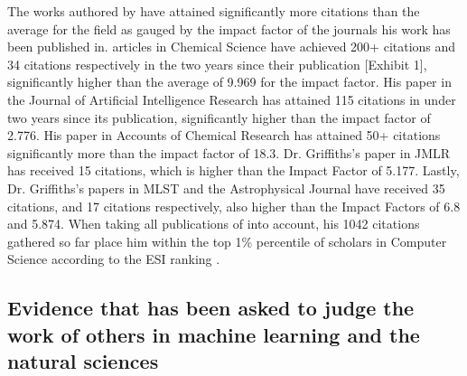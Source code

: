 \documentclass[11pt]{article}
\begin{document}
The works authored by \dr have attained significantly more citations than the average for the field as gauged by the impact factor of the journals his work has been published in. \drs articles in Chemical Science have achieved 200+ citations and 34 citations respectively in the two years since their publication [Exhibit 1], significantly higher than the average of 9.969 for the impact factor. His paper in the Journal of Artificial Intelligence Research has attained 115 citations in under two years since its publication, significantly higher than the impact factor of 2.776. His paper in Accounts of Chemical Research has attained 50+ citations significantly more than the impact factor of 18.3. Dr. Griffiths’s paper in JMLR has received 15 citations, which is higher than the Impact Factor of 5.177. Lastly, Dr. Griffiths’s papers in MLST and the Astrophysical Journal have received 35 citations, and 17 citations respectively, also higher than the Impact Factors of 6.8 and 5.874. When taking all publications of \dr into account, his 1042 citations gathered so far place him within the top 1\% percentile of scholars in Computer Science according to the ESI ranking \cite{esi}.

\subsection{Evidence that \dr has been asked to judge the work of others in machine learning and the natural sciences}
\label{reviews}
\end{document}
